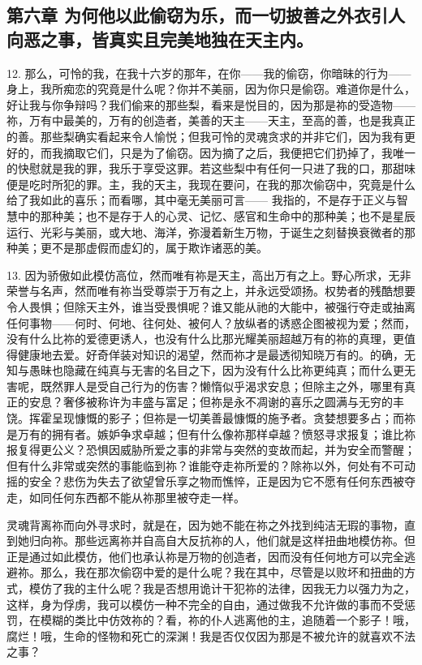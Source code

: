 
\subsection{第六章 为何他以此偷窃为乐，而一切披善之外衣引人向恶之事，皆真实且完美地独在天主内。}

12. 那么，可怜的我，在我十六岁的那年，在你——我的偷窃，你暗昧的行为——身上，我所痴恋的究竟是什么呢？你并不美丽，因为你只是偷窃。难道你是什么，好让我与你争辩吗？我们偷来的那些梨，看来是悦目的，因为那是祢的受造物——祢，万有中最美的，万有的创造者，美善的天主——天主，至高的善，也是我真正的善。那些梨确实看起来令人愉悦；但我可怜的灵魂贪求的并非它们，因为我有更好的，而我摘取它们，只是为了偷窃。因为摘了之后，我便把它们扔掉了，我唯一的快慰就是我的罪，我乐于享受这罪。若这些梨中有任何一只进了我的口，那甜味便是吃时所犯的罪。主，我的天主，我现在要问，在我的那次偷窃中，究竟是什么给了我如此的喜乐；而看哪，其中毫无美丽可言—— 我指的，不是存于正义与智慧中的那种美；也不是存于人的心灵、记忆、感官和生命中的那种美；也不是星辰运行、光彩与美丽，或大地、海洋，弥漫着新生万物，于诞生之刻替换衰微者的那种美；更不是那虚假而虚幻的，属于欺诈诸恶的美。\par

13. 因为骄傲如此模仿高位，然而唯有祢是天主，高出万有之上。野心所求，无非荣誉与名声，然而唯有祢当受尊崇于万有之上，并永远受颂扬。权势者的残酷想要令人畏惧；但除天主外，谁当受畏惧呢？谁又能从祂的大能中，被强行夺走或抽离任何事物——何时、何地、往何处、被何人？放纵者的诱惑企图被视为爱；然而，没有什么比祢的爱德更诱人，也没有什么比那光耀美丽超越万有的祢的真理，更值得健康地去爱。好奇佯装对知识的渴望，然而祢才是最透彻知晓万有的。的确，无知与愚昧也隐藏在纯真与无害的名目之下，因为没有什么比祢更纯真；而什么更无害呢，既然罪人是受自己行为的伤害？懒惰似乎渴求安息；但除主之外，哪里有真正的安息？奢侈被称许为丰盛与富足；但祢是永不凋谢的喜乐之圆满与无穷的丰饶。挥霍呈现慷慨的影子；但祢是一切美善最慷慨的施予者。贪婪想要多占；而祢是万有的拥有者。嫉妒争求卓越；但有什么像祢那样卓越？愤怒寻求报复；谁比祢报复得更公义？恐惧因威胁所爱之事的非常与突然的变故而起，并为安全而警醒；但有什么非常或突然的事能临到祢？谁能夺走祢所爱的？除祢以外，何处有不可动摇的安全？悲伤为失去了欲望曾乐享之物而憔悴，正是因为它不愿有任何东西被夺走，如同任何东西都不能从祢那里被夺走一样。\par

灵魂背离祢而向外寻求时，就是在，因为她不能在祢之外找到纯洁无瑕的事物，直到她归向祢。那些远离祢并自高自大反抗祢的人，他们就是这样扭曲地模仿祢。但正是通过如此模仿，他们也承认祢是万物的创造者，因而没有任何地方可以完全逃避祢。那么，我在那次偷窃中爱的是什么呢？我在其中，尽管是以败坏和扭曲的方式，模仿了我的主什么呢？我是否想用诡计干犯祢的法律，因我无力以强力为之，这样，身为俘虏，我可以模仿一种不完全的自由，通过做我不允许做的事而不受惩罚，在模糊的类比中仿效祢的？看，祢的仆人逃离他的主，追随着一个影子！哦，腐烂！哦，生命的怪物和死亡的深渊！我是否仅仅因为那是不被允许的就喜欢不法之事？\par

